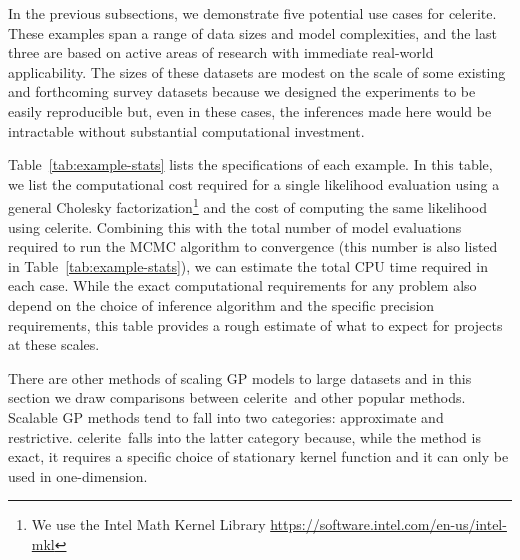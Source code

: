 \documentclass[manuscript, letterpaper]{aastex6}
\makeatletter
\let\origsection\section
\renewcommand\section{\@ifstar{\starsection}{\nostarsection}}
\newcommand\nostarsection[1]{\sectionprelude\origsection{#1}}
\newcommand\starsection[1]{\sectionprelude\origsection*{#1}}
\newcommand\sectionprelude{\vspace{1em}}
\newcommand{\project}[1]{\textsf{#1}}
\newcommand{\celerite}{\project{celerite}}
\newcommand{\sectlabel}[1]{\label{sect:#1}}
\newcommand{\response}[1]{{\color{blue}#1}}
\makeatother
\begin{document}
\response{In the previous subsections, we demonstrate five potential use
cases for \celerite.
These examples span a range of data sizes and model complexities, and the last
three are based on active areas of research with immediate real-world
applicability.
The sizes of these datasets are modest on the scale of some existing and
forthcoming survey datasets because we designed the experiments to be easily
reproducible but, even in these cases, the inferences made here would be
intractable without substantial computational investment.

Table~\ref{tab:example-stats} lists the specifications of each example.
In this table, we list the computational cost required for a single likelihood
evaluation using a general Cholesky factorization\footnote{We use the Intel
Math Kernel Library \url{https://software.intel.com/en-us/intel-mkl}}
and the cost of computing the same likelihood using \celerite.
Combining this with the total number of model evaluations required to run the
MCMC algorithm to convergence (this number is also listed in
Table~\ref{tab:example-stats}), we can estimate the total CPU time required in
each case.
While the exact computational requirements for any problem also depend on the
choice of inference algorithm and the specific precision requirements, this
table provides a rough estimate of what to expect for projects at these
scales.
}



\section{Comparisons to other methods}\sectlabel{compare}

There are other methods of scaling GP models to large datasets and in this
section we draw comparisons between \celerite\ and other popular methods.
Scalable GP methods tend to fall into two categories: approximate and
restrictive.
\celerite\ falls into the latter category because, while the method is exact,
it requires a specific choice of stationary kernel function and it can only be
used in one-dimension.
\end{document}
